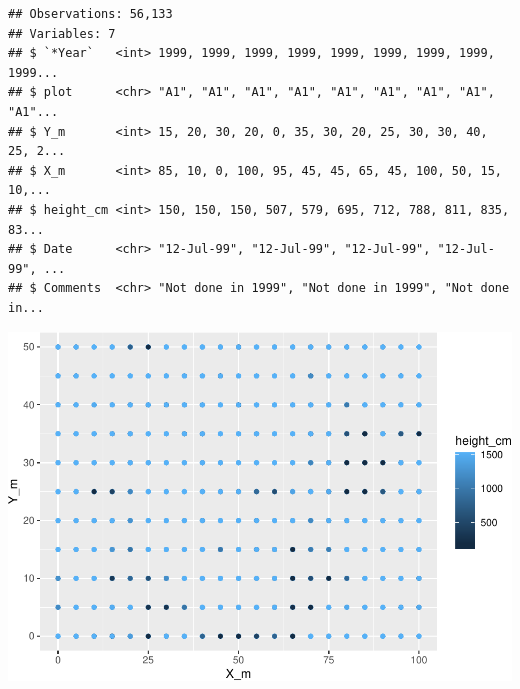 \documentclass[]{article}
\newenvironment{Shaded}{\begin{snugshade}}{\end{snugshade}}
\newcommand{\CommentTok}[1]{\textcolor[rgb]{0.56,0.35,0.01}{\textit{#1}}}
\newcommand{\DataTypeTok}[1]{\textcolor[rgb]{0.13,0.29,0.53}{#1}}
\newcommand{\DecValTok}[1]{\textcolor[rgb]{0.00,0.00,0.81}{#1}}
\newcommand{\KeywordTok}[1]{\textcolor[rgb]{0.13,0.29,0.53}{\textbf{#1}}}
\newcommand{\NormalTok}[1]{#1}
\newcommand{\OperatorTok}[1]{\textcolor[rgb]{0.81,0.36,0.00}{\textbf{#1}}}
\newcommand{\StringTok}[1]{\textcolor[rgb]{0.31,0.60,0.02}{#1}}
\begin{document}
\begin{verbatim}
## Observations: 56,133
## Variables: 7
## $ `*Year`   <int> 1999, 1999, 1999, 1999, 1999, 1999, 1999, 1999, 1999...
## $ plot      <chr> "A1", "A1", "A1", "A1", "A1", "A1", "A1", "A1", "A1"...
## $ Y_m       <int> 15, 20, 30, 20, 0, 35, 30, 20, 25, 30, 30, 40, 25, 2...
## $ X_m       <int> 85, 10, 0, 100, 95, 45, 45, 65, 45, 100, 50, 15, 10,...
## $ height_cm <int> 150, 150, 150, 507, 579, 695, 712, 788, 811, 835, 83...
## $ Date      <chr> "12-Jul-99", "12-Jul-99", "12-Jul-99", "12-Jul-99", ...
## $ Comments  <chr> "Not done in 1999", "Not done in 1999", "Not done in...
\end{verbatim}

\begin{Shaded}
\end{Shaded}

\begin{Shaded}
\end{Shaded}

\includegraphics{R_tidyverse_for_geographers_files/figure-latex/unnamed-chunk-19-1.pdf}
\end{document}
